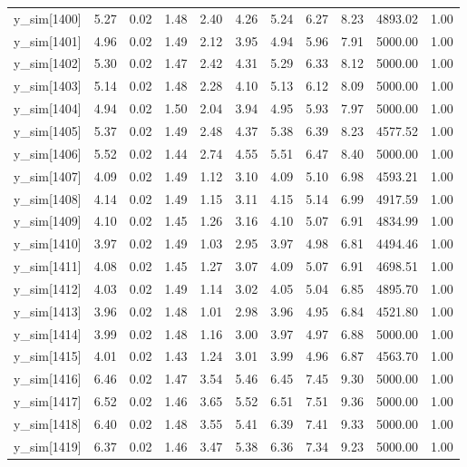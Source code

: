 \begin{table}[ht]
\begin{tabular}{rrrrrrrrrrr}
  y\_sim[1400] & 5.27 & 0.02 & 1.48 & 2.40 & 4.26 & 5.24 & 6.27 & 8.23 & 4893.02 & 1.00 \\ 
  y\_sim[1401] & 4.96 & 0.02 & 1.49 & 2.12 & 3.95 & 4.94 & 5.96 & 7.91 & 5000.00 & 1.00 \\ 
  y\_sim[1402] & 5.30 & 0.02 & 1.47 & 2.42 & 4.31 & 5.29 & 6.33 & 8.12 & 5000.00 & 1.00 \\ 
  y\_sim[1403] & 5.14 & 0.02 & 1.48 & 2.28 & 4.10 & 5.13 & 6.12 & 8.09 & 5000.00 & 1.00 \\ 
  y\_sim[1404] & 4.94 & 0.02 & 1.50 & 2.04 & 3.94 & 4.95 & 5.93 & 7.97 & 5000.00 & 1.00 \\ 
  y\_sim[1405] & 5.37 & 0.02 & 1.49 & 2.48 & 4.37 & 5.38 & 6.39 & 8.23 & 4577.52 & 1.00 \\ 
  y\_sim[1406] & 5.52 & 0.02 & 1.44 & 2.74 & 4.55 & 5.51 & 6.47 & 8.40 & 5000.00 & 1.00 \\ 
  y\_sim[1407] & 4.09 & 0.02 & 1.49 & 1.12 & 3.10 & 4.09 & 5.10 & 6.98 & 4593.21 & 1.00 \\ 
  y\_sim[1408] & 4.14 & 0.02 & 1.49 & 1.15 & 3.11 & 4.15 & 5.14 & 6.99 & 4917.59 & 1.00 \\ 
  y\_sim[1409] & 4.10 & 0.02 & 1.45 & 1.26 & 3.16 & 4.10 & 5.07 & 6.91 & 4834.99 & 1.00 \\ 
  y\_sim[1410] & 3.97 & 0.02 & 1.49 & 1.03 & 2.95 & 3.97 & 4.98 & 6.81 & 4494.46 & 1.00 \\ 
  y\_sim[1411] & 4.08 & 0.02 & 1.45 & 1.27 & 3.07 & 4.09 & 5.07 & 6.91 & 4698.51 & 1.00 \\ 
  y\_sim[1412] & 4.03 & 0.02 & 1.49 & 1.14 & 3.02 & 4.05 & 5.04 & 6.85 & 4895.70 & 1.00 \\ 
  y\_sim[1413] & 3.96 & 0.02 & 1.48 & 1.01 & 2.98 & 3.96 & 4.95 & 6.84 & 4521.80 & 1.00 \\ 
  y\_sim[1414] & 3.99 & 0.02 & 1.48 & 1.16 & 3.00 & 3.97 & 4.97 & 6.88 & 5000.00 & 1.00 \\ 
  y\_sim[1415] & 4.01 & 0.02 & 1.43 & 1.24 & 3.01 & 3.99 & 4.96 & 6.87 & 4563.70 & 1.00 \\ 
  y\_sim[1416] & 6.46 & 0.02 & 1.47 & 3.54 & 5.46 & 6.45 & 7.45 & 9.30 & 5000.00 & 1.00 \\ 
  y\_sim[1417] & 6.52 & 0.02 & 1.46 & 3.65 & 5.52 & 6.51 & 7.51 & 9.36 & 5000.00 & 1.00 \\ 
  y\_sim[1418] & 6.40 & 0.02 & 1.48 & 3.55 & 5.41 & 6.39 & 7.41 & 9.33 & 5000.00 & 1.00 \\ 
  y\_sim[1419] & 6.37 & 0.02 & 1.46 & 3.47 & 5.38 & 6.36 & 7.34 & 9.23 & 5000.00 & 1.00 \\ 

\end{tabular}
\end{table}
